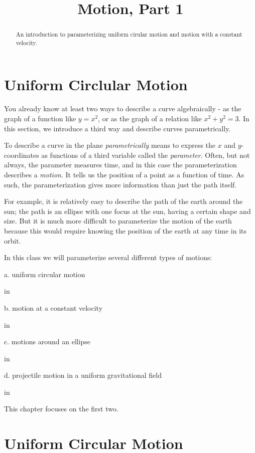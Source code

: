 \documentclass{ximera}
\title{Motion, Part 1}
\newcommand{\pskip}{\vskip 0.1 in}
\begin{document}
\begin{abstract}
An introduction to parameterizing uniform cirular motion and motion with a constant velocity.
\end{abstract}
\maketitle

\section{Uniform Circlular Motion}

You already know at least two ways to describe a curve algebraically - as  the graph of a function like $y=x^2$, or as the graph of a relation like $x^2 + y^2 = 3$. In this section, we introduce a third way and describe curves parametrically. 

To describe a curve in the plane \emph{parametrically} means to express the $x$ and $y$-coordinates as functions of a third variable called the \emph{parameter}. Often, but not always, the parameter measures time, and in this case the parameterization describes a \emph{motion}. It tells us the position of a point as a function of time. As such, the parameterization gives more information than just the path itself.%

For example, it is relatively easy to describe the path of the earth around the sun; the path is an ellipse with one focus at the sun, having a certain shape and size. But it is much more difficult to parameterize the motion of the earth because this would require knowing the position of the earth at any time in its orbit.

In this class we will parameterize several different types of motions:

a. uniform circular motion

\pskip

b. motion at a constant velocity

\pskip

c. motions around an ellipse

\pskip


d. projectile motion in a uniform gravitational field

\pskip

This chapter focuses on the first two.


\section{Uniform Circular Motion}
\end{document}
